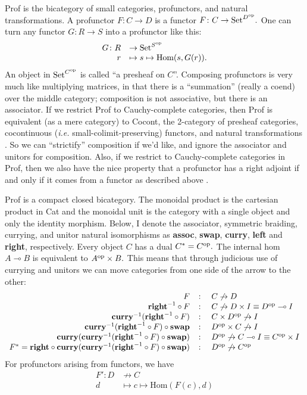 \documentclass[12pt,twoside,openright]{report}
\newcommand{\Set}{\mathrm{Set}}
\newcommand{\maps}{\colon}
\newcommand{\lhom}{\multimap}
\newcommand{\op}{{\rm op}}
\newcommand{\mbold}[1]{\mbox{\bf #1}}
\newcommand{\Hom}{\mbox{Hom}}
\begin{document}
Prof is the bicategory of small categories, profunctors, and natural transformations.  A profunctor $F\maps C \to D$ is a functor $F\maps C \to \Set^{D^{\op}}.$  One can turn any functor $G\maps R \to S$ into a profunctor like this:
\[ \begin{array}{rl}G\maps R &\to \Set^{S^{\op}} \\ r & \mapsto s \mapsto \Hom(s, G(r)).\end{array} \]
An object in $\Set^{C^{\op}}$ is called ``a presheaf on $C$''.  Composing profunctors is very much like multiplying matrices, in that there is a ``summation'' (really a coend) over the middle category; composition is not associative, but there is an associator.  If we restrict Prof to Cauchy-complete categories, then Prof is equivalent (as a mere category) to Cocont, the 2-category of presheaf categories, cocontinuous ({\em i.e.} small-colimit-preserving) functors, and natural transformations \cite[2.7.4]{KS06}.  So we can ``strictify'' composition if we'd like, and ignore the associator and unitors for composition.  Also, if we restrict to Cauchy-complete categories in Prof, then we also have the nice property that a profunctor has a right adjoint if and only if it comes from a functor as described above \cite[Theorem 4.51]{Kelly82}.

Prof is a compact closed bicategory.  The monoidal product is the cartesian product in Cat and the monoidal unit is the category with a single object and only the identity morphism.  Below, I denote the associator, symmetric braiding, currying, and unitor natural isomorphisms as \textbf{assoc}, \textbf{swap}, \textbf{curry}, \textbf{left} and \textbf{right}, respectively.  Every object $C$ has a dual $C^* = C^{\op}.$  The internal hom $A \lhom B$ is equivalent to $A^{\op} \times B.$  This means that through judicious use of currying and unitors we can move categories from one side of the arrow to the other:
\[ \begin{array}{rcl}
  F& \maps & C \not\to D \\
  \mbold{right}^{-1} \circ F& \maps & C \not\to D \times I \equiv D^{\op} \lhom I \\
  \mbold{curry}^{-1}(\mbold{right}^{-1} \circ F)& \maps & C \times D^{\op} \not\to I \\
  \mbold{curry}^{-1}(\mbold{right}^{-1} \circ F) \circ \mbold{swap}& \maps & D^{\op} \times C \not\to I \\
  \mbold{curry}(\mbold{curry}^{-1}(\mbold{right}^{-1} \circ F) \circ \mbold{swap})& \maps & D^{\op} \not\to C \lhom I \equiv C^{\op} \times I \\
  F^* = \mbold{right} \circ \mbold{curry}(\mbold{curry}^{-1}(\mbold{right}^{-1} \circ F) \circ \mbold{swap})& \maps & D^{\op} \not\to C^{\op}
\end{array} \]
For profunctors arising from functors, we have
\[ \begin{array}{rl}F'\maps D &\not\to C \\ d &\mapsto c \mapsto \Hom(F(c), d)\end{array} \]
\end{document}
